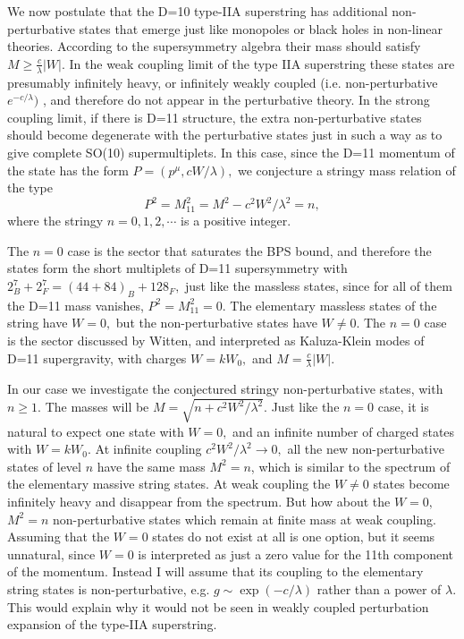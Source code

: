We now postulate that the D=10 type-IIA superstring has additional
non-perturbative states that emerge just like monopoles or black holes in
non-linear theories. According to the supersymmetry algebra their mass
should satisfy $M\geq \frac c\lambda \left| W\right| .$ In the weak coupling
limit of the type IIA superstring these states are presumably infinitely
heavy, or infinitely weakly coupled (i.e. non-perturbative $e^{-c/\lambda })$%
, and therefore do not appear in the perturbative theory. In the strong
coupling limit, if there is D=11 structure, the extra non-perturbative
states should become degenerate with the perturbative states just in such a
way as to give complete SO(10) supermultiplets. In this case, since the D=11
momentum of the state has the form $P=(p^\mu ,cW/\lambda ),$ we conjecture a
stringy mass relation of the type
\begin{equation}
P^2=M_{11}^2=M^2-c^2W^2/\lambda ^2=n,
\end{equation}
where the stringy $n=0,1,2,\cdots $ is a positive integer.

The $n=0$ case is the sector that saturates the BPS bound, and therefore the
states form the short multiplets of D=11 supersymmetry with $%
2_B^7+2_F^7=(44+84)_B+128_F,$ just like the massless states, since for all
of them the D=11 mass vanishes, $P^2=M_{11}^2=0$. The elementary massless
states of the string have $W=0,$ but the non-perturbative states have $W\neq
0.$ The $n=0$ case is the sector discussed by Witten, and interpreted as
Kaluza-Klein modes of D=11 supergravity, with charges $W=kW_0,$ and $M=\frac
c\lambda \left| W\right| $.

In our case we investigate the conjectured stringy non-perturbative states,
with $n\geq 1.$ The masses will be $M=\sqrt{n+c^2W^2/\lambda ^2}.$ Just like
the $n=0$ case, it is natural to expect one state with $W=0,$ and an
infinite number of charged states with $W=kW_0.$ At infinite coupling $%
c^2W^2/\lambda ^2\rightarrow 0,$ all the new non-perturbative states of
level $n$ have the same mass $M^2=n$, which is similar to the spectrum of
the elementary massive string states. At weak coupling the $W\neq 0$ states
become infinitely heavy and disappear from the spectrum. But how about the $%
W=0,$ $M^2=n$ non-perturbative states which remain at finite mass at weak
coupling. Assuming that the $W=0$ states do not exist at all is one option,
but it seems unnatural, since $W=0$ is interpreted as just a zero value for
the 11th component of the momentum. Instead I will assume that its coupling
to the elementary string states is non-perturbative, e.g. $g\sim \exp
(-c/\lambda )$ rather than a power of $\lambda .$ This would explain why it
would not be seen in weakly coupled perturbation expansion of the type-IIA
superstring.

